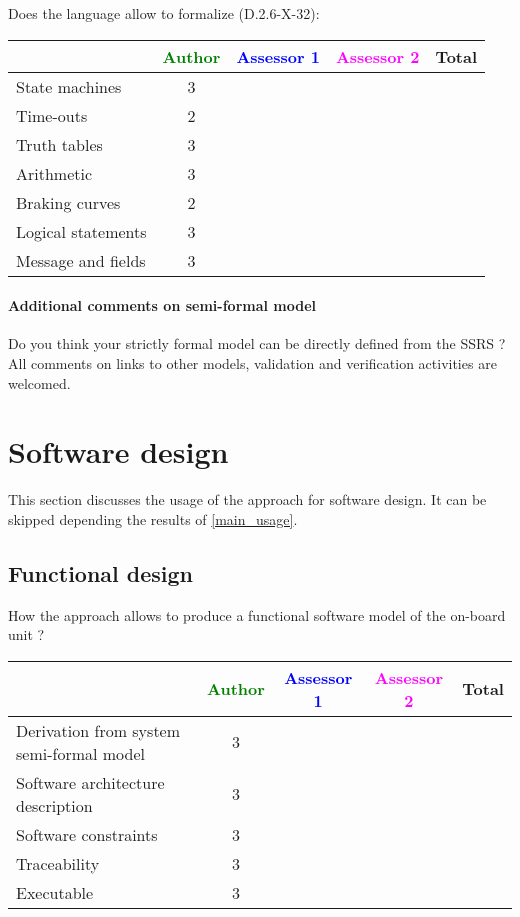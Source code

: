 Does the language allow to  formalize (D.2.6-X-32):

\begin{tabular}{|l | c | c | c | c|}
\hline
& \textcolor{green}{Author} & \textcolor{blue}{Assessor 1} & \textcolor{magenta}{Assessor 2} & Total \\
\hline 
State machines  & 3 & & &  \\
\hline
Time-outs  & 2 & & &  \\
\hline
Truth tables  & 3 & & &  \\
\hline
Arithmetic  & 3 & & &  \\
\hline
Braking curves  & 2 & & &  \\
\hline
Logical statements & 3 & & &  \\
\hline
Message and fields & 3 & & &  \\
\hline
\end{tabular}

\paragraph{Additional comments on semi-formal  model} Do you think your strictly formal  model can be directly defined from the SSRS ?
All comments on links to  other models, validation and verification activities are welcomed.


\section{Software design}
This section discusses the usage of the approach for software design.
It can be skipped depending the results of \ref{main_usage}.

\subsection{Functional design}

How the approach allows to  produce a functional software model of the on-board unit ?

\begin{tabular}{|l | c | c | c | c|}
\hline
& \textcolor{green}{Author} & \textcolor{blue}{Assessor 1} & \textcolor{magenta}{Assessor 2} & Total \\
\hline
Derivation from system semi-formal model  & 3 & & &  \\
\hline 
Software architecture description  & 3 & & &  \\
\hline
Software constraints  & 3 & & &  \\
\hline
Traceability  & 3 & & &  \\
\hline
Executable  & 3  & & &  \\
\hline
\end{tabular}

